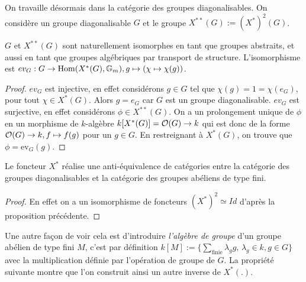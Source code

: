On travaille désormais dans la catégorie des groupes diagonalisables. On considère un groupe diagonalisable $G$ et le groupe $X^{**}(G):=(X^*)^2(G)$.

\begin{prop}\label{GDiagNatuIsomBidualite}
$G$ et $X^{**}(G)$ sont naturellement isomorphes en tant que groupes abstraits, et aussi en tant que groupes algébriques par transport de structure. L'isomorphisme est $ev_G : G\rightarrow \operatorname{Hom} (X^*(G),\mathbb{G} _m), g\mapsto (\chi\mapsto \chi(g))$.
\end{prop}
\begin{proof}
$ev_G$ est injective, en effet considérons $g\in G$ tel que $\chi(g)=1=\chi(e_G)$, pour tout $\chi\in X^*(G)$. Alors $g=e_G$ car $G$ est un groupe diagonalisable. $ev_G$ est surjective, en effet considérons $\phi\in X^{**}(G)$. On a un prolongement unique de $\phi$ en un morphisme de $k$-algèbre $k[X^*(G)]=\mathcal{O}(G)\rightarrow k$ qui est donc de la forme $\mathcal{O}(G)\rightarrow k, f\mapsto f(g)$ pour un $g\in G$. En restreignant à $X^*(G)$, on trouve que $\phi=\textrm{ev}_G(g)$.
\end{proof}

\begin{cor}\label{EqCatGpDiagGpAb}
Le foncteur $X^*$ réalise une anti-équivalence de catégories entre la catégorie des groupes diagonalisables et la catégorie des groupes abéliens de type fini. 
\end{cor}
\begin{proof}
En effet on a un isomorphisme de foncteurs $(X^*)^2\simeq Id$ d'après la proposition précédente.
\end{proof}

Une autre façon de voir cela est d'introduire \textit{l'algèbre de groupe} d'un groupe abélien de type fini $M$, c'est par définition $k[M]:=\lbrace \sum_{\text{finie}} \lambda_gg,\,\lambda_g\in k,g\in G \rbrace$ avec la multiplication définie par l'opération de groupe de $G$. La propriété suivante montre que l'on construit ainsi un autre inverse de $X^*(.)$.

